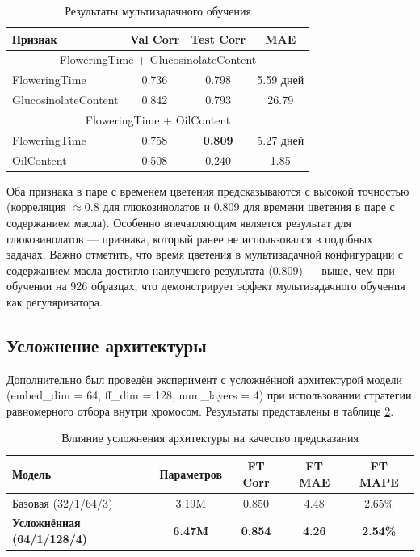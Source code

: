\begin{table}
	\centering
	\caption{Результаты мультизадачного обучения}
	\label{tab:multitask_rapeseed}
	\begin{tabular}{|l|c|c|c|}
		\hline
		\textbf{Признак} & \textbf{Val Corr} & \textbf{Test Corr} & \textbf{MAE} \\ \hline
		\multicolumn{4}{|c|}{FloweringTime + GlucosinolateContent} \\ \hline
		FloweringTime & 0.736 & 0.798 & 5.59 дней \\
		GlucosinolateContent & 0.842 & 0.793 & 26.79 \\ \hline
		\multicolumn{4}{|c|}{FloweringTime + OilContent} \\ \hline
		FloweringTime & 0.758 & \textbf{0.809} & 5.27 дней \\
		OilContent & 0.508 & 0.240 & 1.85 \\ \hline
	\end{tabular}
\end{table}

Оба признака в паре с временем цветения предсказываются с высокой 
точностью (корреляция $\approx 0.8$ для глюкозинолатов и 0.809 для 
времени цветения в паре с содержанием масла). Особенно впечатляющим 
является результат для глюкозинолатов — признака, который ранее 
не использовался в подобных задачах. Важно отметить, что время 
цветения в мультизадачной конфигурации с содержанием масла достигло 
наилучшего результата (0.809) — выше, чем при обучении на 926 образцах, 
что демонстрирует эффект мультизадачного обучения как регуляризатора.

\subsection{Усложнение архитектуры}

Дополнительно был проведён эксперимент с усложнённой архитектурой 
модели (embed\_dim = 64, ff\_dim = 128, num\_layers = 4) при 
использовании стратегии равномерного отбора внутри хромосом. 
Результаты представлены в таблице \ref{tab:architecture_complexity}.

\begin{table}
	\centering
	\caption{Влияние усложнения архитектуры на качество предсказания}
	\label{tab:architecture_complexity}
	\begin{tabular}{|l|c|c|c|c|}
		\hline
		\textbf{Модель} & \textbf{Параметров} & \textbf{FT Corr} & \textbf{FT MAE} & \textbf{FT MAPE} \\ \hline
		Базовая (32/1/64/3) & 3.19M & 0.850 & 4.48 & 2.65\% \\ \hline
		\textbf{Усложнённая (64/1/128/4)} & \textbf{6.47M} & \textbf{0.854} & \textbf{4.26} & \textbf{2.54\%} \\ \hline
	\end{tabular}
\end{table}

